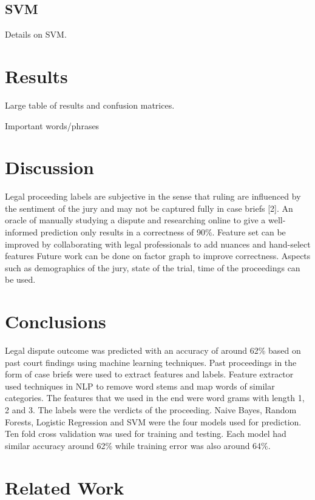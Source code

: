 \documentclass[journal]{IEEEtran}
\begin{document}
\subsection{SVM}

Details on SVM.

\section{Results}

Large table of results and confusion matrices.

Important words/phrases

\section{Discussion}

Legal proceeding labels are subjective in the sense that ruling are influenced by the sentiment of the jury and may not be captured fully in case briefs [2]. An oracle of manually studying a dispute and researching online to give a well-informed prediction only results in a correctness of 90\%. Feature set can be improved by collaborating with legal professionals to add nuances and hand-select features
Future work can be done on factor graph to improve correctness. Aspects such as demographics of the jury, state of the trial, time of the proceedings can be used.



\section{Conclusions}

Legal dispute outcome was predicted with an accuracy of around 62\% based on past court findings using machine learning techniques. Past proceedings in the form of case briefs were used to extract features and labels. Feature extractor used techniques in NLP to remove word stems and map words of similar categories. The features that we used in the end were word grams with length 1, 2 and 3. The labels were the verdicts of the proceeding. Naive Bayes, Random Forests, Logistic Regression and SVM were the four models used for prediction. Ten fold cross validation was used for training and testing. Each model had similar accuracy around 62\% while training error was also around 64\%. 




\section{Related Work}
\end{document}
